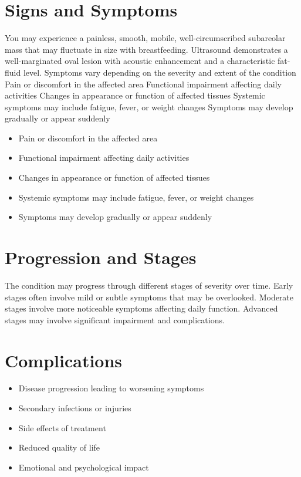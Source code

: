 \section{Signs and Symptoms}
You may experience a painless, smooth, mobile, well-circumscribed subareolar mass that may fluctuate in size with breastfeeding. Ultrasound demonstrates a well-marginated oval lesion with acoustic enhancement and a characteristic fat-fluid level. Symptoms vary depending on the severity and extent of the condition Pain or discomfort in the affected area Functional impairment affecting daily activities Changes in appearance or function of affected tissues Systemic symptoms may include fatigue, fever, or weight changes Symptoms may develop gradually or appear suddenly

\begin{itemize}[noitemsep]
  \item Pain or discomfort in the affected area
  \item Functional impairment affecting daily activities
  \item Changes in appearance or function of affected tissues
  \item Systemic symptoms may include fatigue, fever, or weight changes
  \item Symptoms may develop gradually or appear suddenly
\end{itemize}
\section{Progression and Stages}
The condition may progress through different stages of severity over time. Early stages often involve mild or subtle symptoms that may be overlooked. Moderate stages involve more noticeable symptoms affecting daily function. Advanced stages may involve significant impairment and complications.
\section{Complications}
\begin{itemize}[noitemsep]
  \item Disease progression leading to worsening symptoms
  \item Secondary infections or injuries
  \item Side effects of treatment
  \item Reduced quality of life
  \item Emotional and psychological impact
\end{itemize}
